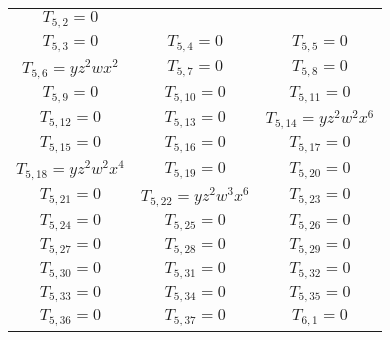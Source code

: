 \begin{longtable}{|c|c|c|}
$T_{5,2}= 0$\\

$T_{5,3}= 0$&

$T_{5,4}= 0$&

$T_{5,5}= 0$\\

$T_{5,6}= yz^2wx^2$&

$T_{5,7}= 0$&

$T_{5,8}= 0$\\

$T_{5,9}= 0$&

$T_{5,10}= 0$&

$T_{5,11}= 0$\\

$T_{5,12}= 0$&

$T_{5,13}= 0$&

$T_{5,14}= yz^2w^2x^6$\\

$T_{5,15}= 0$&

$T_{5,16}= 0$&

$T_{5,17}= 0$\\

$T_{5,18}= yz^2w^2x^4$&

$T_{5,19}= 0$&

$T_{5,20}= 0$\\

$T_{5,21}= 0$&

$T_{5,22}= yz^2w^3x^6$&

$T_{5,23}= 0$\\

$T_{5,24}= 0$&

$T_{5,25}= 0$&

$T_{5,26}= 0$\\

$T_{5,27}= 0$&

$T_{5,28}= 0$&

$T_{5,29}= 0$\\

$T_{5,30}= 0$&

$T_{5,31}= 0$&

$T_{5,32}= 0$\\

$T_{5,33}= 0$&

$T_{5,34}= 0$&

$T_{5,35}= 0$\\

$T_{5,36}= 0$&

$T_{5,37}= 0$&

$T_{6,1}= 0$\\


\end{longtable}
